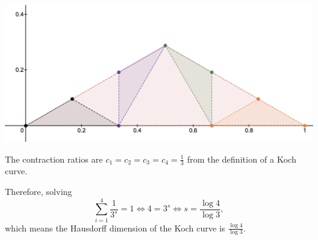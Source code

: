 \begin{center}
    \includegraphics[scale=0.5]{solutions/section-4-1/diag-4-1-2.png}
\end{center}

The contraction ratios are \(c_1 = c_2 = c_3 = c_4 = \frac{1}{3}\) from the definition of a Koch curve.

Therefore, solving
\[
\sum_{i = 1}^{4} \frac{1}{3^s} = 1 \iff 4 = 3^s \iff s = \frac{\log 4}{\log 3},
\]
which means the Hausdorff dimension of the Koch curve is \(\frac{\log 4}{\log 3}\).